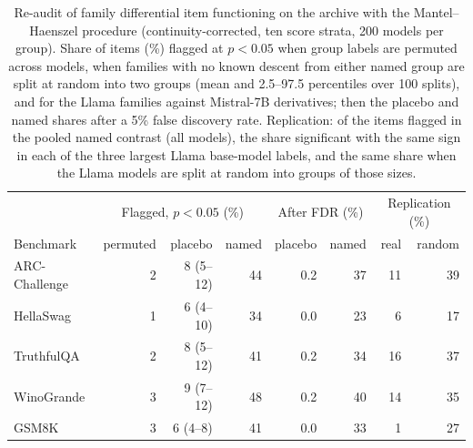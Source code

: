 \begin{table}[!htb]\centering\footnotesize\setlength{\tabcolsep}{3.5pt}
\caption{Re-audit of family differential item functioning on the archive with the Mantel--Haenszel procedure (continuity-corrected, ten score strata, 200 models per group). Share of items (\%) flagged at $p<0.05$ when group labels are permuted across models, when families with no known descent from either named group are split at random into two groups (mean and 2.5--97.5 percentiles over 100 splits), and for the Llama families against Mistral-7B derivatives; then the placebo and named shares after a 5\% false discovery rate. Replication: of the items flagged in the pooled named contrast (all models), the share significant with the same sign in each of the three largest Llama base-model labels, and the same share when the Llama models are split at random into groups of those sizes.}\label{tab:dif}
\begin{tabular}{lrrr|rr|rr}
\toprule
 & \multicolumn{3}{c|}{Flagged, $p<0.05$ (\%)} & \multicolumn{2}{c|}{After FDR (\%)} & \multicolumn{2}{c}{Replication (\%)}\\
Benchmark & permuted & placebo & named & placebo & named & real & random\\
\midrule
ARC-Challenge & 2 & 8 (5--12) & 44 & 0.2 & 37 & 11 & 39\\
HellaSwag & 1 & 6 (4--10) & 34 & 0.0 & 23 & 6 & 17\\
TruthfulQA & 2 & 8 (5--12) & 41 & 0.2 & 34 & 16 & 37\\
WinoGrande & 3 & 9 (7--12) & 48 & 0.2 & 40 & 14 & 35\\
GSM8K & 3 & 6 (4--8) & 41 & 0.0 & 33 & 1 & 27\\
\bottomrule
\end{tabular}
\end{table}
